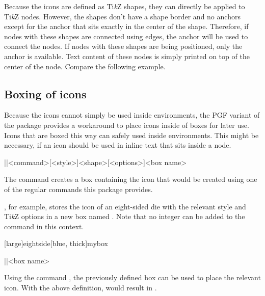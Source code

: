 \documentclass[a4paper]{article}
\begin{document}
Because the icons are defined as Ti\emph{k}Z shapes, they can directly be applied to Ti\emph{k}Z nodes. However, the shapes don't have a shape border and no anchors except for the  anchor that sits exactly in the center of the shape. Therefore, if nodes with these shapes are connected using edges, the  anchor will be used to connect the nodes. If nodes with these shapes are being positioned, only the  anchor is available. Text content of these nodes is simply printed on top of the center of the node. Compare the following example.

\begin{codeexample}
\end{codeexample}

\subsection{Boxing of icons}

Because the icons cannot simply be used inside  environments, the PGF variant of the package provides a workaround to place icons inside of boxes for later use. Icons that are boxed this way can safely used inside  environments. This might be necessary, if an icon should be used in inline text that sits inside a node.

\begin{macrodef}|\provideprotectedrpgicon|{<command>}[<style>]{<shape>}[<options>]{<box name>}\end{macrodef}
The command \macro{\provideprotectedrpgicon} creates a box containing the icon that would be created using one of the regular commands this package provides. 

, for example, stores the icon of an eight-sided die with the relevant style and Ti\emph{k}Z options in a new box named . Note that no integer can be added to the  command in this context.

[large]{eightside}[blue, thick]{mybox}

\begin{macrodef}|\useprotectedrpgicon|{<box name>}\end{macrodef}
Using the command \macro{\useprotectedrpgicon}, the previously defined box can be used to place the relevant icon. With the above definition,  would result in .
\end{document}

